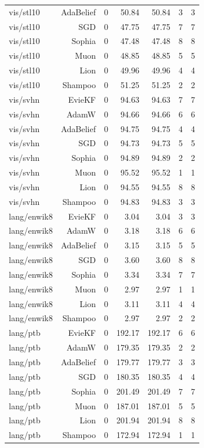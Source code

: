 \begin{table}[t]
\begin{tabular}{lrrrrrr}
vis/stl10 & AdaBelief & 0 & 50.84 & 50.84 & 3 & 3 \\
vis/stl10 & SGD & 0 & 47.75 & 47.75 & 7 & 7 \\
vis/stl10 & Sophia & 0 & 47.48 & 47.48 & 8 & 8 \\
vis/stl10 & Muon & 0 & 48.85 & 48.85 & 5 & 5 \\
vis/stl10 & Lion & 0 & 49.96 & 49.96 & 4 & 4 \\
vis/stl10 & Shampoo & 0 & 51.25 & 51.25 & 2 & 2 \\
vis/svhn & EvieKF & 0 & 94.63 & 94.63 & 7 & 7 \\
vis/svhn & AdamW & 0 & 94.66 & 94.66 & 6 & 6 \\
vis/svhn & AdaBelief & 0 & 94.75 & 94.75 & 4 & 4 \\
vis/svhn & SGD & 0 & 94.73 & 94.73 & 5 & 5 \\
vis/svhn & Sophia & 0 & 94.89 & 94.89 & 2 & 2 \\
vis/svhn & Muon & 0 & 95.52 & 95.52 & 1 & 1 \\
vis/svhn & Lion & 0 & 94.55 & 94.55 & 8 & 8 \\
vis/svhn & Shampoo & 0 & 94.83 & 94.83 & 3 & 3 \\
lang/enwik8 & EvieKF & 0 & 3.04 & 3.04 & 3 & 3 \\
lang/enwik8 & AdamW & 0 & 3.18 & 3.18 & 6 & 6 \\
lang/enwik8 & AdaBelief & 0 & 3.15 & 3.15 & 5 & 5 \\
lang/enwik8 & SGD & 0 & 3.60 & 3.60 & 8 & 8 \\
lang/enwik8 & Sophia & 0 & 3.34 & 3.34 & 7 & 7 \\
lang/enwik8 & Muon & 0 & 2.97 & 2.97 & 1 & 1 \\
lang/enwik8 & Lion & 0 & 3.11 & 3.11 & 4 & 4 \\
lang/enwik8 & Shampoo & 0 & 2.97 & 2.97 & 2 & 2 \\
lang/ptb & EvieKF & 0 & 192.17 & 192.17 & 6 & 6 \\
lang/ptb & AdamW & 0 & 179.35 & 179.35 & 2 & 2 \\
lang/ptb & AdaBelief & 0 & 179.77 & 179.77 & 3 & 3 \\
lang/ptb & SGD & 0 & 180.35 & 180.35 & 4 & 4 \\
lang/ptb & Sophia & 0 & 201.49 & 201.49 & 7 & 7 \\
lang/ptb & Muon & 0 & 187.01 & 187.01 & 5 & 5 \\
lang/ptb & Lion & 0 & 201.94 & 201.94 & 8 & 8 \\
lang/ptb & Shampoo & 0 & 172.94 & 172.94 & 1 & 1 \\

\end{tabular}
\end{table}
